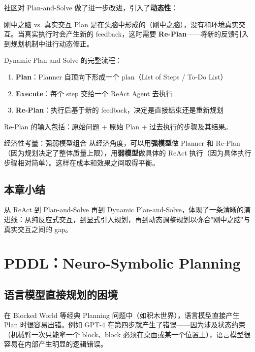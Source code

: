 \documentclass[a4paper]{article}
\begin{document}
社区对 Plan-and-Solve 做了进一步改进，引入了\textbf{动态性}：

\begin{importantbox}{刚中之脑 vs. 真实交互}
Plan 是在头脑中形成的（刚中之脑），没有和环境真实交互。当真实执行时会产生新的 feedback，这时需要 \textbf{Re-Plan}——将新的反馈引入到规划机制中进行动态修正。
\end{importantbox}

Dynamic Plan-and-Solve 的完整流程：
\begin{enumerate}
    \item \textbf{Plan}：Planner 自顶向下形成一个 plan（List of Steps / To-Do List）
    \item \textbf{Execute}：每个 step 交给一个 ReAct Agent 去执行
    \item \textbf{Re-Plan}：执行后基于新的 feedback，决定是直接结束还是重新规划
\end{enumerate}

Re-Plan 的输入包括：原始问题 + 原始 Plan + 过去执行的步骤及其结果。

\begin{knowledgebox}{经济性考量：强弱模型组合}
从经济角度，可以用\textbf{强模型}做 Planner 和 Re-Plan（因为规划决定了整体质量上限），用\textbf{弱模型}做具体的 ReAct 执行（因为具体执行步骤相对简单）。这样在成本和效果之间取得平衡。
\end{knowledgebox}

\subsection{本章小结}

从 ReAct 到 Plan-and-Solve 再到 Dynamic Plan-and-Solve，体现了一条清晰的演进线：从纯反应式交互，到显式引入规划，再到动态调整规划以弥合"刚中之脑"与真实交互之间的 gap。


\section{PDDL：Neuro-Symbolic Planning}

\subsection{语言模型直接规划的困境}

在 Blocked World 等经典 Planning 问题中（如积木世界），语言模型直接产生 Plan 时很容易出错。例如 GPT-4 在第四步就产生了错误——因为涉及状态约束（机械臂一次只能拿一个 block、block 必须在桌面或某一个位置上），语言模型很容易在内部产生明显的逻辑错误。
\end{document}
